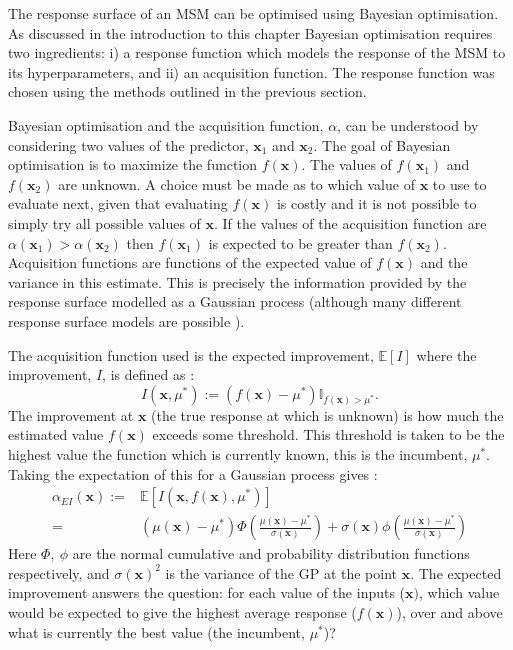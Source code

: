The response surface of an MSM can be optimised using Bayesian optimisation. As discussed in the introduction to this chapter Bayesian optimisation requires two ingredients: i) a response function which models the response of the MSM to its hyperparameters, and ii) an acquisition function. The response function was chosen using the methods outlined in the previous section. 

Bayesian optimisation and the acquisition function, $\alpha$, can be understood by considering two values of the predictor, $\mathbf{x}_{1}$ and $\mathbf{x}_{2}$.  The goal of Bayesian optimisation is to maximize the function $f(\mathbf{x})$. The values of $f(\mathbf{x}_{1})$ and $f(\mathbf{x}_{2})$ are unknown. A choice must be made as to which value of $\mathbf{x}$ to use to evaluate next, given that evaluating $f(\mathbf{x})$ is costly and it is not possible to simply try all possible values of $\mathbf{x}$. If the values of the acquisition function are $\alpha( \mathbf{x}_{1} ) > \alpha( \mathbf{x}_{2} ) $  then $f(\mathbf{x}_{1})$ is expected to be greater than $f(\mathbf{x}_{2})$.   Acquisition functions are functions of the expected value of $f(\mathbf{x})$ and the variance in this estimate. This is precisely the information provided by the response surface modelled as a Gaussian process (although many different response surface models are possible \cite{rasmussenGaussianProcessesMachine2006}).   

The acquisition function used is the expected improvement, $\mathbb{E}\left[I\right]$ where the improvement, $I$, is defined as \cite{shahriariTakingHumanOut2016}:
\begin{equation}
    I(\mathbf{x}, \mu^{*}):=(f(\mathbf{x}) - \mu^{*}) \mathbb{I}_{f(\mathbf{x}) > \mu^{*}}.
\end{equation}
The improvement at $\mathbf{x}$ (the true response at which is unknown) is how much the estimated value $f(\mathbf{x})$ exceeds some threshold. This threshold is taken to be the highest value the function which is currently known, this is the incumbent, $\mu^{*}$.
Taking the expectation of this for a Gaussian process gives \cite{shahriariTakingHumanOut2016}:
\begin{align}\label{eqn:msm_ei_def}
        \alpha_{EI}(\mathbf{x}) := &  \mathbb{E}\left[I(\mathbf{x}, f(\mathbf{x}), \mu^{*})\right] \\
         =  &(\mu(\mathbf{x}) - \mu^{*})\Phi\left( \frac{ \mu(\mathbf{x}) - \mu^{*} }{\sigma(\mathbf{x})} \right ) + \sigma(\mathbf{x})\phi\left( \frac{ \mu(\mathbf{x}) - \mu^{*} }{\sigma(\mathbf{x}) } \right )
\end{align}
Here $\Phi,\ \phi$ are the normal cumulative and probability distribution functions respectively, and $\sigma(\mathbf{x})^{2}$ is the variance of the GP at the point $\mathbf{x}$.  The expected improvement answers the question: for each value of the inputs ($\mathbf{x})$, which value would be expected to give the highest average response ($f(\mathbf{x})$), over and above what is currently the best value (the incumbent, $\mu^{*}$)? 

